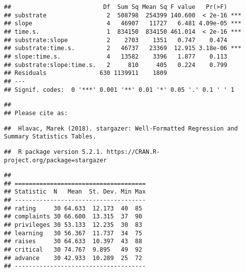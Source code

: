 \documentclass[]{article}
\begin{document}
\begin{verbatim}
##                          Df  Sum Sq Mean Sq F value   Pr(>F)    
## substrate                 2  508798  254399 140.600  < 2e-16 ***
## slope                     4   46907   11727   6.481 4.09e-05 ***
## time.s.                   1  834150  834150 461.014  < 2e-16 ***
## substrate:slope           2    2703    1351   0.747    0.474    
## substrate:time.s.         2   46737   23369  12.915 3.18e-06 ***
## slope:time.s.             4   13582    3396   1.877    0.113    
## substrate:slope:time.s.   2     810     405   0.224    0.799    
## Residuals               630 1139911    1809                     
## ---
## Signif. codes:  0 '***' 0.001 '**' 0.01 '*' 0.05 '.' 0.1 ' ' 1
\end{verbatim}

\begin{verbatim}
## 
## Please cite as:
\end{verbatim}

\begin{verbatim}
##  Hlavac, Marek (2018). stargazer: Well-Formatted Regression and Summary Statistics Tables.
\end{verbatim}

\begin{verbatim}
##  R package version 5.2.1. https://CRAN.R-project.org/package=stargazer
\end{verbatim}

\begin{verbatim}
## 
## =====================================
## Statistic  N   Mean  St. Dev. Min Max
## -------------------------------------
## rating     30 64.633  12.173  40  85 
## complaints 30 66.600  13.315  37  90 
## privileges 30 53.133  12.235  30  83 
## learning   30 56.367  11.737  34  75 
## raises     30 64.633  10.397  43  88 
## critical   30 74.767  9.895   49  92 
## advance    30 42.933  10.289  25  72 
## -------------------------------------
\end{verbatim}
\end{document}

